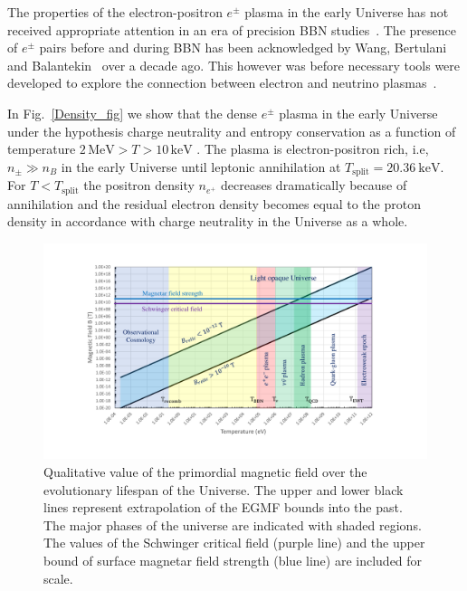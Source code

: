 \documentclass[universe,article,submit,moreauthors,pdftex,a4paper]{Definitions/mdpi}
\newcommand*{\rf}[1]{Fig.~{\ref{#1}}}
\begin{document}
The properties of the electron-positron $e^{\pm}$ plasma in the early Universe has not received appropriate attention in an era of precision BBN studies~\cite{Pitrou:2018cgg}. The presence of $e^{\pm}$ pairs before and during BBN has been acknowledged by Wang, Bertulani and Balantekin~\cite{Wang:2010px} over a decade ago. This however was before necessary tools were developed to explore the connection between electron and neutrino plasmas~\cite{Mangano:2005cc,Birrell:2012gg,Birrell:2014uka}. 

In \rf{Density_fig} we show that the dense $e^{\pm}$ plasma in the early Universe under the hypothesis charge neutrality and entropy conservation as a function of temperature $2\,\mathrm{MeV}>T>10\,\mathrm{keV}$ \cite{Chris:2023abc}. The plasma is electron-positron rich, i.e, $n_{\pm}\gg n_B$ in the early Universe until leptonic annihilation at $T_{\mathrm{split}} = 20.36\ \mathrm{keV}$. For $T<T_{\mathrm{split}}$ the positron density $n_{e^+}$ decreases dramatically because of annihilation and the residual electron density becomes equal to the proton density in accordance with charge neutrality in the Universe as a whole.
\begin{figure}[htbp]
  \centering  \includegraphics[trim=110 50 120 40,clip,width=\textwidth]{./plots/relic_plot.PDF}
  \caption{Qualitative value of the primordial magnetic field over the evolutionary lifespan of the Universe. The upper and lower black lines represent extrapolation of the EGMF bounds into the past. The major phases of the universe are indicated with shaded regions. The values of the Schwinger critical field (purple line) and the upper bound of surface magnetar field strength (blue line) are included for scale.\label{relic_plot}}
\end{figure}
\end{document}
